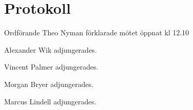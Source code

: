 \documentclass[10pt]{article}
\def\mo{Theo Nyman}
\begin{document}
\section*{Protokoll}
\begin{paragrafer}
Ordförande {\mo} förklarade mötet öppnat kl 12.10

{\valavmo}

{\valavms}

{\valavj}

{\tosg}












Alexander Wik adjungerades.

Vincent Palmer adjungerades.

Morgan Bryer adjungerades.

Marcus Lindell adjungerades.







\end{paragrafer}
\end{document}
